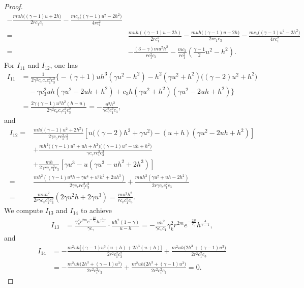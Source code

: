 \documentclass[11pt,reqno]{article}
\numberwithin{equation}{section}
\begin{document}
\begin{proof}
\begin{align*}
- \frac{m u h\big((\gamma-1)u+2h\big)}{2r c_1 c_3}
- \frac{m c_3\big((\gamma-1)u^{2}-2h^{2}\big)}{4r c_1^2} \\
=& \frac{muh ((\gamma-1)u-2h)}{2r c_1^2}- \frac{m u h\big((\gamma-1)u+2h\big)}{2r c_1 c_3}
- \frac{m c_3\big((\gamma-1)u^{2}-2h^{2}\big)}{4r c_1^2} \\
=& -\frac{(3-\gamma) m u^2 h^2}{r c_1^2 c_3}- \frac{m c_3}{r c_1^2}\left( \frac{\gamma-1}{2}u^{2} - h^{2} \right).
\end{align*}
For $I_{11}$ and $I_{12}$, one has
\begin{align*}
I_{11}
&= \frac{1}{2\gamma^{2} c_v c_\gamma c_1^{2} c_3^{2}} \bigg\{
   -(\gamma+1)uh^{3}(\gamma u^{2}-h^{2})
   - h^{2}(\gamma u^{2}+h^{2})\big((\gamma-2)u^{2}+h^{2}\big) \\
&\quad - \gamma c_3^{2} uh(\gamma u^{2}-2uh+h^{2})
   +c_3 h(\gamma u^{2}+h^{2})(\gamma u^{2}-2uh+h^{2}) \bigg\} \\
&= \frac{2\gamma(\gamma-1)u^3 h^2(h-u)}{2\gamma^{2} c_v c_\gamma c_1^{2} c_3^2} = -\frac{u^3 h^2}{\gamma c_v^2 c_1^{2} c_3},
\end{align*}
and
\begin{align*}
I_{12}
=& \frac{mh\big((\gamma-1)u^{2}+2h^{2}\big)}{2\gamma c_\gamma r c_1^{2}c_3^{2}} \left[ u\big((\gamma-2)h^{2}+\gamma u^{2}\big)
- (u+h)(\gamma u^{2}-2uh+h^{2}) \right] \\
&+ \frac{mh^{2}\big((\gamma-1)u^{2}+uh+h^{2}\big)\big((\gamma-1)u^{2}-uh+h^{2}\big)}{\gamma c_\gamma r c_1^{2} c_3^{2}} \\
&+ \frac{mh}{2\gamma rc_v c_1^{2} c_3} \left[ \gamma u^{3}
- u(\gamma u^{3}-uh^{2}+2h^{3}) \right]\\
=&\frac{mh^2\left( (\gamma-1)u^3 h + \gamma u^4 + u^2 h^2 + 2 u h^3 \right)}{2\gamma c_v r c_1^{2} c_3^{2}}
  +\frac{muh^2\left( \gamma u^2 + uh -2 h^2 \right)}{2r \gamma c_v c_1^2 c_3}\\
=&\frac{mu h^2 }{2r\gamma c_v c_1^2 c_3^2} \left( 2\gamma u^2 h + 2\gamma u^3  \right)
= \frac{mu^3 h^2 }{r c_v c_1^2 c_3}.
\end{align*}
We compute $I_{13}$ and $I_{14}$ to achieve
\begin{align*}
I_{13}
&= \frac{\gamma_k^2 r^{2m} e^{-\frac{2S}{c_\gamma}} h^{\frac{4}{\gamma-1}} }{\gamma c_{\gamma}}
\cdot \frac{u h^2(1 - \gamma)}{u-h}  = -\frac{u h^2}{\gamma c_v c_1}\gamma_k^2 r^{2m} e^{-\frac{2S}{c_\gamma}} h^{\frac{4}{\gamma-1}},
\end{align*}
and
\begin{align*}
I_{14}
&= -\frac{m^{2}uh\big[ (\gamma-1)u^{3}(u+h) + 2h^{3}(u+h) \big]}{2r^{2} c_1^{2} c_3^{2}}
   + \frac{m^{2}uh\big(2h^{3}+(\gamma-1)u^{3}\big)}{2r^{2} c_1^{2} c_3} \\
&= -\frac{m^{2}uh\big(2h^{3}+(\gamma-1)u^{3}\big)}{2r^{2} c_1^{2} c_3}
   + \frac{m^{2}uh\big(2h^{3}+(\gamma-1)u^{3}\big)}{2r^{2} c_1^{2} c_3}= 0.
\end{align*}


\end{proof}
\end{document}
